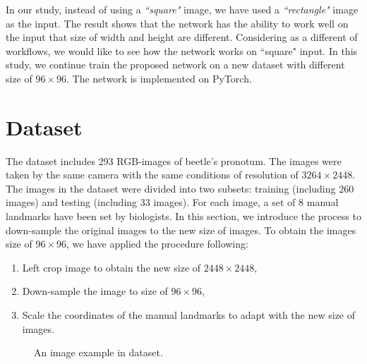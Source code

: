 \documentclass[12pt,a4paper]{article}
\begin{document}
In our study, instead of using a \textit{``square"} image, we have used a \textit{``rectangle"} image as the input. The result shows that the network has the ability to work well on the input that size of width and height are different. Considering as a different of workflows, we would like to see how the network works on ``square" input. In this study, we continue train the proposed network on a new dataset with different size of $96 \times 96$. The network is implemented on PyTorch.

\section{Dataset}
The dataset includes 293 RGB-images of beetle's pronotum. The images were taken by the same camera with the same conditions of resolution of $3264 \times 2448$. The images in the dataset were divided into two subsets: training (including $260$ images) and testing (including $33$ images). For each image, a set of 8 manual landmarks have been set by biologists.
In this section, we introduce the process to down-sample the original images to the new size of images. To obtain the images size of $96 \times 96$, we have applied the procedure following:
\begin{enumerate}[nosep]
	\item Left crop image to obtain the new size of $2448 \times 2448$,
	\item Down-sample the image to size of $96 \times 96$,
	\item Scale the coordinates of the manual landmarks to adapt with the new size of images.
\end{enumerate}

\begin{figure}[h!]
\centering
{}
\caption{An image example in dataset.}
\end{figure}
\end{document}
